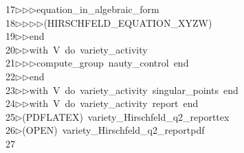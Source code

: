 \begin{tabbing}
17\>$\triangleright$\>$\triangleright$\>$\triangleright$\>equation\_in\_algebraic\_form\ \\[0pt]
18\>$\triangleright$\>$\triangleright$\>$\triangleright$\>$\triangleright$\>(HIRSCHFELD\_EQUATION\_XYZW)\ \\[0pt]
19\>$\triangleright$\>$\triangleright$\>end\ \\[0pt]
20\>$\triangleright$\>$\triangleright$\>with\ V\ do\ variety\_activity\ \\[0pt]
21\>$\triangleright$\>$\triangleright$\>$\triangleright$\>compute\_group\ nauty\_control\ end\ \\[0pt]
22\>$\triangleright$\>$\triangleright$\>end\ \\[0pt]
23\>$\triangleright$\>$\triangleright$\>with\ V\ do\ variety\_activity\ singular\_points\ end\ \\[0pt]
24\>$\triangleright$\>$\triangleright$\>with\ V\ do\ variety\_activity\ report\ end\\[0pt]
25\>$\triangleright$\>(PDFLATEX)\ variety\_Hirschfeld\_q2\_reporttex\\[0pt]
26\>$\triangleright$\>(OPEN)\ variety\_Hirschfeld\_q2\_reportpdf\\[0pt]
27\>\end{tabbing}
